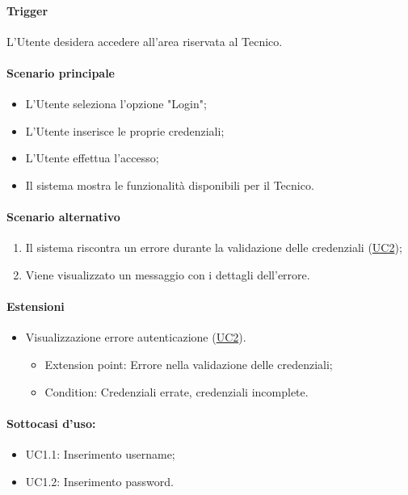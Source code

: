 \paragraph*{Trigger}
L'Utente desidera accedere all'area riservata al Tecnico.

\paragraph*{Scenario principale}
\begin{itemize}
  \item L'Utente seleziona l'opzione "Login";
  \item L'Utente inserisce le proprie credenziali;
  \item L'Utente effettua l'accesso;
  \item Il sistema mostra le funzionalità disponibili per il Tecnico.
\end{itemize}

\paragraph*{Scenario alternativo}
\begin{enumerate}
  \item Il sistema riscontra un errore durante la validazione delle credenziali (\hyperref[UC2]{UC2});
  \item Viene visualizzato un messaggio con i dettagli dell'errore.
\end{enumerate}

\paragraph*{Estensioni}
\begin{itemize}
  \item Visualizzazione errore autenticazione (\hyperref[UC2]{UC2}).
  \begin{itemize}
    \item Extension point: Errore nella validazione delle credenziali;
    \item Condition: Credenziali errate, credenziali incomplete.
  \end{itemize}
\end{itemize}

\paragraph*{Sottocasi d'uso:}
\begin{itemize}
  \item UC1.1: Inserimento username;
  \item UC1.2: Inserimento password.
\end{itemize}

